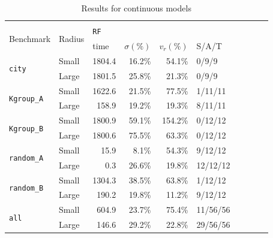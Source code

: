 \begin{table}[]
{\begin{tabular}{|l|l|*{4}{r}|*{4}{r}}
\cline{1-10}
\multicolumn{10}{c}{}\\
\cline{1-6}

\multirow{2}{*}{Benchmark} & \multirow{2}{*}{Radius}  & \multicolumn{4}{l|}{\texttt{RF}}                                                                                 	& \multicolumn{4}{l}{}                                                                                                    	\\ \cline{3-6}
                  	&  	& \multicolumn{1}{l|}{time} & \multicolumn{1}{l|}{$\sigma(\%)$} & \multicolumn{1}{l|}{$v_r(\%)$} & \multicolumn{1}{l|}{S/A/T} & \multicolumn{1}{l}{} & \multicolumn{1}{l}{} & \multicolumn{1}{l}{} & \multicolumn{1}{l}{}  \\ \cline{1-6}
\multirow{2}{*}{\texttt{city}}&Small & 1804.4 & 16.2\% & 54.1\% & \multicolumn{1}{l|}{0/9/9} \\
&Large & 1801.5 & 25.8\% & 21.3\% & \multicolumn{1}{l|}{0/9/9} \\  \cline{1-1}
\multirow{2}{*}{\texttt{Kgroup\_A}}&Small & 1622.6 & 21.5\% & 77.5\% & \multicolumn{1}{l|}{1/11/11} \\
&Large & 158.9 & 19.2\% & 19.3\% & \multicolumn{1}{l|}{8/11/11} \\  \cline{1-1}
\multirow{2}{*}{\texttt{Kgroup\_B}}&Small & 1800.9 & 59.1\% & 154.2\% & \multicolumn{1}{l|}{0/12/12} \\
&Large & 1800.6 & 75.5\% & 63.3\% & \multicolumn{1}{l|}{0/12/12} \\  \cline{1-1}
\multirow{2}{*}{\texttt{random\_A}}&Small & 15.9 & 8.1\% & 54.3\% & \multicolumn{1}{l|}{9/12/12} \\
&Large & 0.3 & 26.6\% & 19.8\% & \multicolumn{1}{l|}{12/12/12} \\  \cline{1-1}
\multirow{2}{*}{\texttt{random\_B}}&Small & 1304.3 & 38.5\% & 63.8\% & \multicolumn{1}{l|}{1/12/12} \\
&Large & 190.2 & 19.8\% & 11.2\% & \multicolumn{1}{l|}{9/12/12} \\  \cline{1-6}
\multirow{2}{*}{\texttt{all}}&Small & 604.9 & 23.7\% & 75.4\% & \multicolumn{1}{l|}{11/56/56} \\
&Large & 146.6 & 29.2\% & 22.8\% & \multicolumn{1}{l|}{29/56/56} \\
\cline{1-6}
\end{tabular}
}

\caption{Results for continuous models} \label{tab.cm}
\end{table}



